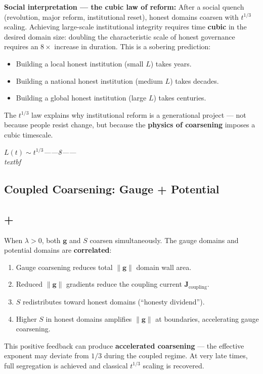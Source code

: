 \documentclass[12pt,a4paper]{article}
\theoremstyle{plain}
\theoremstyle{definition}
\newcommand{\gf}{\mathbf{g}}          %
\newcommand{\Sf}{S}                   %
\newcommand{\cn}[1]{\textcolor{scxgray}{\textit{#1}}}
\begin{document}
\textbf{Social interpretation — the cubic law of reform:} After a social
quench (revolution, major reform, institutional reset), honest domains
coarsen with $t^{1/3}$ scaling. Achieving large-scale institutional
integrity requires time \textbf{cubic} in the desired domain size:
doubling the characteristic scale of honest governance requires an
$8\times$ increase in duration. This is a sobering prediction:
\begin{itemize}
    \item Building a local honest institution (small $L$) takes years.
    \item Building a national honest institution (medium $L$) takes decades.
    \item Building a global honest institution (large $L$) takes centuries.
\end{itemize}
The $t^{1/3}$ law explains why institutional reform is a generational
project — not because people resist change, but because the \textbf{physics
of coarsening} imposes a cubic timescale.

\bigskip
\noindent
\cn{$L(t)\sim t^{1/3}$——8——\\textbf{}}

\subsection{Coupled Coarsening: Gauge + Potential}
\subsection*{+}

When $\lambda>0$, both $\gf$ and $\Sf$ coarsen simultaneously. The gauge
domains and potential domains are \textbf{correlated}:
\begin{enumerate}[label=(\arabic*)]
    \item Gauge coarsening reduces total $\|\gf\|$ domain wall area.
    \item Reduced $\|\gf\|$ gradients reduce the coupling current
          $\mathbf{J}_{\text{coupling}}$.
    \item $\Sf$ redistributes toward honest domains (``honesty dividend'').
    \item Higher $\Sf$ in honest domains amplifies $\|\gf\|$ at boundaries,
          accelerating gauge coarsening.
\end{enumerate}

This positive feedback can produce \textbf{accelerated coarsening} — the
effective exponent may deviate from $1/3$ during the coupled regime.
At very late times, full segregation is achieved and classical $t^{1/3}$
scaling is recovered.
\end{document}
